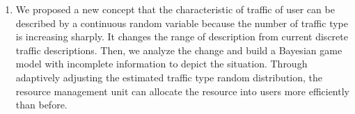 {\begin{enumerate}[(1)]
    \item We proposed a new concept that the characteristic of traffic of user can be described by a continuous random variable because the number of traffic type is increasing sharply. It changes the range of description from current discrete traffic descriptions. Then, we analyze the change and  build a Bayesian game model with incomplete information to depict the situation.
Through adaptively adjusting the estimated traffic type random distribution, the resource management unit can allocate the resource into users more efficiently than before.
\end{enumerate}

}

